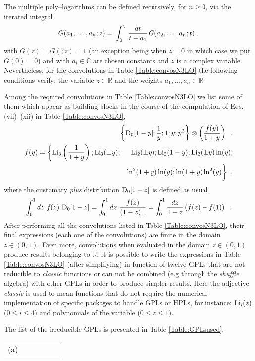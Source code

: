 \documentclass[12pt]{article}
\def\beq{\begin{equation}}
\def\eeq{\end{equation}}
\def\beeq{\begin{eqnarray}}
\def\eeeq{\end{eqnarray}}
\def\nn{\nonumber}
\newcommand\f[2]{\frac{#1}{#2}}
\newcommand{\rd}{d}
\begin{document}
\begin{appendix}
The multiple poly--logarithms can be defined recursively, for $n\geq 0$, via the iterated integral~\cite{Goncharov:1998kja,Goncharov:2001iea}
 \beq\label{MultPolyLogdef}
 G(a_1,\ldots,a_n;z)=\,\int_0^z\,{\rd t\over t-a_1}\,G(a_2,\ldots,a_n;t)\,,\\
\eeq
with $G(z) = G(;z)=1$ (an exception being when $z=0$ in which case we put $G(0)=0$) and with $a_i\in \mathbb{C}$ are chosen constants and $z$ is a complex variable. Nevertheless, for the convolutions in Table \ref{Table:convosN3LO} the following conditions verify: the variable $z\in \mathbb{R}$ and the weights $a_1,\ldots,a_n \in \mathbb{R}$.

Among the required convolutions in Table \ref{Table:convosN3LO} we list some of them which appear as building blocks in the course of the computation of Eqs.  (vii)--(xii) in Table \ref{Table:convosN3LO},
\beeq
\!\!\!\!\!\!\!\!\!\!\!\!&&\!\!\!\!\!\!\!\!\!\!\!\!\!\!\!\!\!\!\!\!\!\!\!\!\!\!\!\!\!\!\!\!\!\!\!\!\!\!\!\!\!\!\!\!\!\!\!\!\bigg\{{\rm D}_{0}[1-y];\f{1}{y};1;y;y^{2}\bigg\} \otimes \left( \f{f(y)}{1+y} \right)\;\;,\\
f(y)=\bigg\{{\rm Li}_{3}\left(\f{1}{1+y}\right); {\rm Li}_{3}(\pm y);&&\!\!\!\!\!\!\!\!\!{\rm Li}_{2}(\pm y); {\rm Li}_{2}(1- y); {\rm Li}_{2}(\pm y) \ln(y);\nn\\
&&\ln^{2}(1+y)\ln(y);\ln(1+y)\ln^{2}(y)\bigg\}\;\;,
\eeeq
where the customary \textit{plus} distribution ${\rm D}_{0}[1-z]$ is defined as usual 
\beeq
\int^{1}_{0}dz~f(z)~{\rm D}_{0}[1-z] =\int^{1}_{0}dz~\f{f(z)}{(1-z)_{+}} = \int^{1}_{0}\f{dz}{1-z}\left( f(z)-f(1)\right)\;\;.
\eeeq
After performing all the convolutions listed in Table \ref{Table:convosN3LO}, their final expressions (each one of the convolutions) are finite in the domain $z\in (0,1)$. Even more, convolutions when evaluated in the domain $z\in (0,1)$ produce results belonging to $\mathbb{R}$. It is possible to write the expressions in Table \ref{Table:convosN3LO} (after simplifying) in function of twelve GPLs that are not reducible to \textit{classic} functions or can not be combined (e.g through the \textit{shuffle} algebra) with other GPLs in order to produce simpler results. Here the adjective  \textit{classic} is used to mean functions that do not require the numerical implementation of specific packages to handle GPLs or HPLs, for instance: ${\rm Li}_{i}(z)$ ($ 0 \leq i \leq 4$) and polynomials of the variable ($ 0 \leq z \leq 1$).

The list of the irreducible GPLs is presented in Table \ref{Table:GPLsused}.
\begin{table}
\begin{center}
\renewcommand{\arraystretch}{1.5}
\begin{tabular}{ |c|c||c|c||c|c| }
\hline
\multirow{1}{*}{(a)} 


\end{tabular}
\end{center}
\end{table}
\end{appendix}
\end{document}
